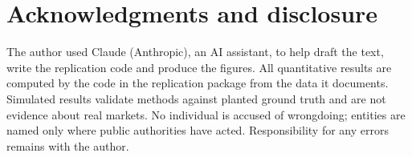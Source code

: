 \documentclass{article}
\theoremstyle{plain}
\theoremstyle{definition}
\theoremstyle{remark}
\newcommand{\1}{\mathbf{1}}
\begin{document}
\section*{Acknowledgments and disclosure}
The author used Claude (Anthropic), an AI assistant, to help draft the text, write the replication code and produce
the figures. All quantitative results are computed by the code in the replication package from the data it documents.
Simulated results validate methods against planted ground truth and are not evidence about real markets. No individual
is accused of wrongdoing; entities are named only where public authorities have acted. Responsibility for any errors
remains with the author.

{}
{\small\setlength{\bibsep}{3pt plus 1pt}

}

\appendix

\end{document}
